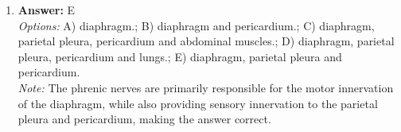 \documentclass[12pt]{article}
\begin{document}
\begin{enumerate}[label=\arabic*.]
\\ \textit{Note:} The dorsal roots of all spinal nerves contain sensory neuronal processes, while motor and autonomic neuronal processes are found in the ventral roots, making the correct answer "motor and autonomic neuronal processes" inaccurate for this question.
\item \textbf{Answer:} E
\\ \textit{Options:} A) diaphragm.; B) diaphragm and pericardium.; C) diaphragm, parietal pleura, pericardium and abdominal muscles.; D) diaphragm, parietal pleura, pericardium and lungs.; E) diaphragm, parietal pleura and pericardium.
\\ \textit{Note:} The phrenic nerves are primarily responsible for the motor innervation of the diaphragm, while also providing sensory innervation to the parietal pleura and pericardium, making the answer correct.
\end{enumerate}
\end{document}
